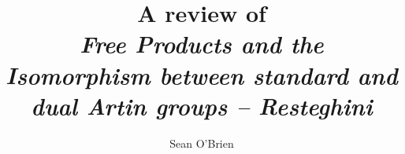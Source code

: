 \documentclass{amsart}
\begin{document}
\title[Resteghini 2024; Review]{A review of \\
	\emph{Free Products and the Isomorphism between standard and dual Artin groups -- Resteghini}}


\author{Sean O'Brien}
\address{}
\curraddr{}




\maketitle









\end{document}

